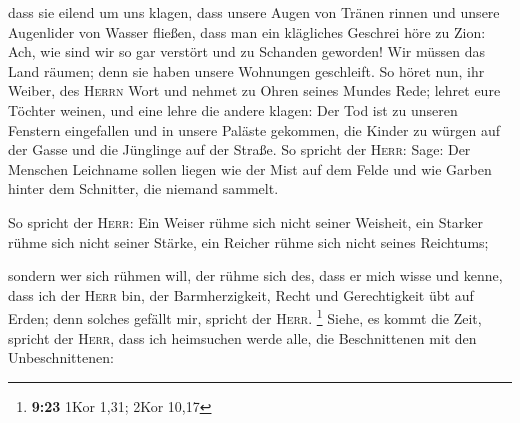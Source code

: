  dass sie eilend um uns klagen, dass unsere Augen von
Tränen rinnen und unsere Augenlider von Wasser fließen, 
dass man ein klägliches Geschrei höre zu Zion: Ach, wie sind wir so gar
verstört und zu Schanden geworden! Wir müssen das Land räumen; denn sie
haben unsere Wohnungen geschleift.  So höret nun, ihr
Weiber, des \textsc{Herrn} Wort und nehmet zu Ohren seines Mundes Rede;
lehret eure Töchter weinen, und eine lehre die andere klagen:
 Der Tod ist zu unseren Fenstern eingefallen und in
unsere Paläste gekommen, die Kinder zu würgen auf der Gasse und die
Jünglinge auf der Straße.  So spricht der \textsc{Herr}:
Sage: Der Menschen Leichname sollen liegen wie der Mist auf dem Felde
und wie Garben hinter dem Schnitter, die niemand sammelt.

 So spricht der \textsc{Herr}: Ein Weiser rühme sich
nicht seiner Weisheit, ein Starker rühme sich nicht seiner Stärke, ein
Reicher rühme sich nicht seines Reichtums;

 sondern wer sich rühmen will, der rühme sich des, dass
er mich wisse und kenne, dass ich der \textsc{Herr} bin, der
Barmherzigkeit, Recht und Gerechtigkeit übt auf Erden; denn solches
gefällt mir, spricht der \textsc{Herr}. \footnote{\textbf{9:23} 1Kor
  1,31; 2Kor 10,17}  Siehe, es kommt die Zeit, spricht
der \textsc{Herr}, dass ich heimsuchen werde alle, die Beschnittenen mit
den Unbeschnittenen:

